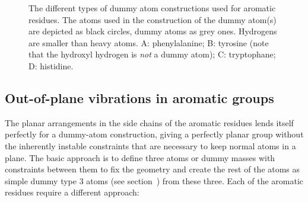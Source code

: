 \begin{figure}
\centerline{}
\caption[Dummy atom constructions for aromatic residues.]{The
different types of dummy atom constructions used for aromatic
residues. The atoms used in the construction of the dummy atom(s) are
depicted as black circles, dummy atoms as grey ones. Hydrogens are
smaller than heavy atoms. {\sf A}: phenylalanine; {\sf B}: tyrosine
(note that the hydroxyl hydrogen is {\em not} a dummy atom); {\sf C}:
tryptophane; {\sf D}: histidine.}
\label{fig:dumaro}
\end{figure}

\subsection{Out-of-plane vibrations in aromatic groups}
\label{sec:dummyaro}
The planar arrangements in the side chains of the aromatic residues
lends itself perfectly for a dummy-atom construction, giving a
perfectly planar group without the inherently instable constraints
that are necessary to keep normal atoms in a plane. The basic approach
is to define three atoms or dummy masses with constraints between them
to fix the geometry and create the rest of the atoms as simple dummy
type 3 atoms (see section~) from these three. Each of
the aromatic residues require a different approach:

